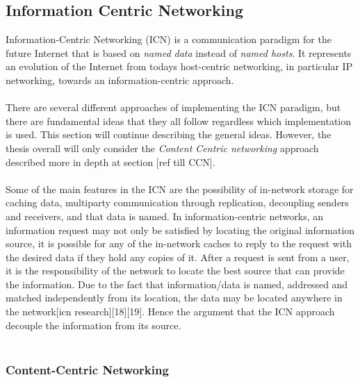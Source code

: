 
\subsection{Information Centric Networking}
Information-Centric Networking (ICN) is a communication paradigm for the future Internet that is based on \textit{named data} instead of \textit{named hosts}. It represents an evolution of the Internet from todays host-centric networking, in particular IP networking, towards an information-centric approach.\\\\
There are several different approaches of implementing the ICN paradigm, but there are fundamental ideas that they all follow regardless which implementation is used. This section will continue describing the general ideas. However, the thesis overall will only consider the \textit{Content Centric networking} approach described more in depth at section [ref till CCN].\\\\
Some of the main features in the ICN are the possibility of in-network storage for caching data, multiparty communication through replication, decoupling senders and receivers, and that data is named\cite{Ahlgren2012}. In information-centric networks, an information request may not only be satisfied by locating the original information source, it is possible for any of the in-network caches to reply to the request with the desired data if they hold any copies of it. After a request is sent from a user, it is the responsibility of the network to locate the best source that can provide the information. Due to the fact that information/data is named, addressed and matched independently from its location, the data may be located anywhere in the network[icn research][18][19]. Hence the argument that the ICN approach decouple the information from its source.\\\\




\subsubsection{Content-Centric Networking}



